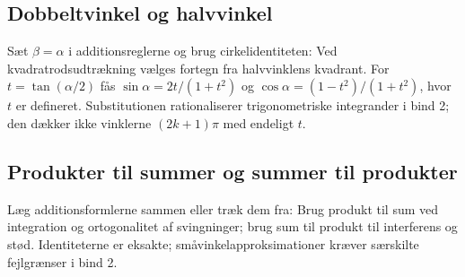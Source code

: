 

\subsection{Dobbeltvinkel og halvvinkel}
Sæt $\beta=\alpha$ i additionsreglerne og brug cirkelidentiteten:
Ved kvadratrodsudtrækning vælges fortegn fra halvvinklens kvadrant.
For $t=\tan(\alpha/2)$ fås
$\sin\alpha=2t/(1+t^2)$ og $\cos\alpha=(1-t^2)/(1+t^2)$,
hvor $t$ er defineret. Substitutionen rationaliserer trigonometriske
integrander i bind 2; den dækker ikke vinklerne $(2k+1)\pi$ med endeligt $t$.

\subsection{Produkter til summer og summer til produkter}
Læg additionsformlerne sammen eller træk dem fra:
Brug produkt til sum ved integration og ortogonalitet af svingninger;
brug sum til produkt til interferens og stød. Identiteterne er eksakte;
småvinkelapproksimationer kræver særskilte fejlgrænser i bind 2.

